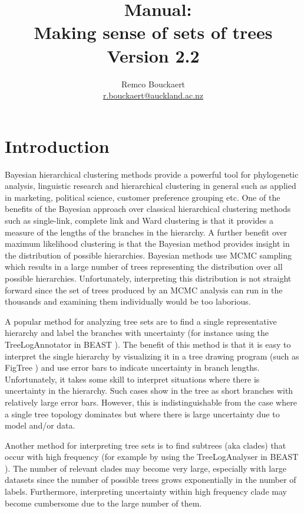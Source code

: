 \documentclass{article}
\title{\DensiTree\ Manual: \\{Making sense of sets of trees}\\Version 2.2}
\author{Remco Bouckaert\\
\url{r.bouckaert@auckland.ac.nz}\\
}
\begin{document}
\maketitle
\newpage
\tableofcontents
\newpage


\section{Introduction}

Bayesian hierarchical clustering methods provide a powerful tool for phylogenetic 
analysis, linguistic research and hierarchical clustering in general such as applied
in marketing, political science, customer preference grouping etc.
One of the benefits of the Bayesian approach over classical hierarchical clustering
methods such as single-link, complete link and Ward clustering is that it provides
a measure of the lengths of the branches in the hierarchy. A further benefit over
maximum likelihood clustering is that the Bayesian method provides insight in the 
distribution of possible hierarchies.
Bayesian methods use MCMC sampling which results in a large number of trees
representing the distribution over all possible hierarchies.
Unfortunately, interpreting this distribution is not straight forward since
the set of trees produced by an MCMC analysis can run in the thousands
and examining them individually would be too laborious.

A popular method for analyzing tree sets are to find a single representative
hierarchy and label the branches with uncertainty (for instance using the
TreeLogAnnotator in BEAST \cite{BEAST}). The benefit of this method is that it is 
easy to interpret the single hierarchy by visualizing it in a tree drawing program
(such as FigTree \cite{FigTree}) and use error bars to indicate uncertainty in 
branch lengths. Unfortunately, it takes some skill to interpret situations
where there is uncertainty in the hierarchy. Such cases show in the tree
as short branches with relatively large error bars. However, this is indistinguishable
from the case where a single tree topology dominates but where there is large 
uncertainty due to model and/or data.

Another method for interpreting tree sets is to find subtrees (aka clades) that
occur with high frequency (for example by using the TreeLogAnalyser in BEAST 
\cite{BEAST}). The number of relevant clades may become very large, especially
with large datasets since the number of possible trees grows exponentially
in the number of labels. Furthermore, interpreting uncertainty within high
frequency clade may become cumbersome due to the large number of them.
\end{document}

